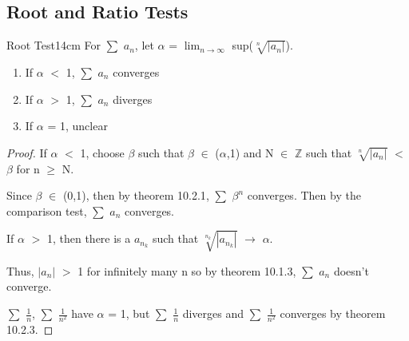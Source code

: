     \vspace{0.3cm}





\subsection{ Root and Ratio Tests }

    \begin{wtheorem}{Root Test}{14cm}
        For $\sum$ $a_n$, let
        $\alpha$ = $\lim_{n \rightarrow \infty}$ sup($\sqrt[n]{|a_n|}$).
    \end{wtheorem}

    \begin{enumerate}[label=(\alph*), leftmargin=3cm, itemsep=0.1cm]
        \item If $\alpha$ $<$ 1, $\sum$ $a_n$ converges
        
        \item If $\alpha$ $>$ 1, $\sum$ $a_n$ diverges
        
        \item If $\alpha$ = 1, unclear
    \end{enumerate}

    \begin{proof}
        If $\alpha$ $<$ 1, choose $\beta$ such that $\beta$ $\in$ ($\alpha$,1)
        and N $\in$ $\mathbb{Z}$ such that $\sqrt[n]{|a_n|}$ $<$ $\beta$ for
        n $\geq$ N.

        Since $\beta$ $\in$ (0,1), then by {\color{red} theorem 10.2.1},
        $\sum$ $\beta^n$ converges.
        Then by the {\color{red} comparison test}, $\sum$ $a_n$ converges.

        \vspace{0.2cm}

        If $\alpha$ $>$ 1, then there is a $a_{n_k}$ such that
        $\sqrt[n_k]{|a_{n_k}|}$ $\rightarrow$ $\alpha$.

        Thus, $|a_n|$ $>$ 1 for infinitely many n so 
        by {\color{red} theorem 10.1.3}, $\sum$ $a_n$ doesn't converge.

        \vspace{0.2cm}

        $\sum$ $\frac{1}{n}$, $\sum$ $\frac{1}{n^2}$
        have $\alpha$ = 1, but $\sum$ $\frac{1}{n}$ diverges and
        $\sum$ $\frac{1}{n^2}$ converges by {\color{red} theorem 10.2.3}.
    \end{proof}

